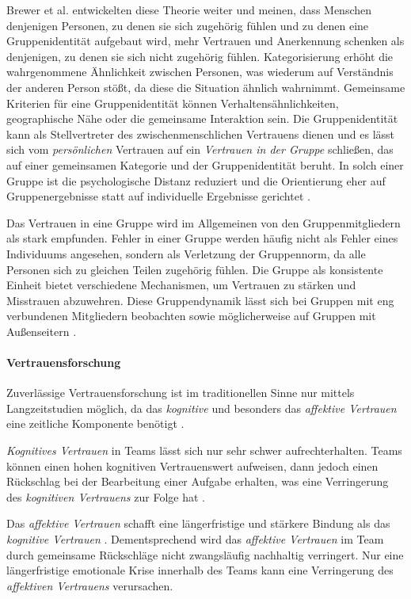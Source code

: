 \documentclass[a4paper,11pt]{article}%
\renewcommand{\\}{\vspace*{0.5\baselineskip} \newline}
\begin{document}
Brewer et al. \citep[S. 355-360]{brewer1981} entwickelten diese Theorie weiter und meinen, dass Menschen denjenigen Personen, zu denen sie sich zugehörig fühlen und zu denen eine Gruppenidentität aufgebaut wird, mehr Vertrauen und Anerkennung schenken als denjenigen, zu denen sie sich nicht zugehörig fühlen. Kategorisierung erhöht die wahrgenommene Ähnlichkeit zwischen Personen, was wiederum auf Verständnis der anderen Person stößt, da diese die Situation ähnlich wahrnimmt.
Gemeinsame Kriterien für eine Gruppenidentität können Verhaltensähnlichkeiten, geographische Nähe oder die gemeinsame Interaktion sein. Die Gruppenidentität kann als Stellvertreter des zwischenmenschlichen Vertrauens dienen und es lässt sich vom \textit{persönlichen} Vertrauen auf ein \textit{Vertrauen in der Gruppe} schließen, das auf einer gemeinsamen Kategorie und der Gruppenidentität beruht.
In solch einer Gruppe ist die psychologische Distanz reduziert und die Orientierung eher auf Gruppenergebnisse statt auf individuelle Ergebnisse gerichtet \citep[S. 355-360]{brewer1981}.

Das Vertrauen in eine Gruppe wird im Allgemeinen von den Gruppenmitgliedern als stark empfunden. Fehler in einer Gruppe werden häufig nicht als Fehler eines Individuums angesehen, sondern als Verletzung der Gruppennorm, da alle Personen sich zu gleichen Teilen zugehörig fühlen. Die Gruppe als konsistente Einheit bietet verschiedene Mechanismen, um Vertrauen zu stärken und Misstrauen abzuwehren. Diese Gruppendynamik lässt sich bei Gruppen mit eng verbundenen Mitgliedern beobachten sowie möglicherweise auf Gruppen mit Außenseitern \citep[S. 397-403]{stolle2002trusting}.

\paragraph{Vertrauensforschung}
\label{Vertrauensforschung}
Zuverlässige Vertrauensforschung ist im traditionellen Sinne nur mittels Langzeitstudien möglich, da das \textit{kognitive} und besonders das \textit{affektive Vertrauen} eine zeitliche Komponente benötigt \citep{jones1998experience}.

\textit{Kognitives Vertrauen} in Teams lässt sich nur sehr schwer aufrechterhalten. Teams können einen hohen kognitiven Vertrauenswert aufweisen, dann jedoch einen Rückschlag bei der Bearbeitung einer Aufgabe erhalten, was eine Verringerung des \textit{kognitiven Vertrauens} zur Folge hat \citep[S. 29-31]{mcallister1995affect}.

Das \textit{affektive Vertrauen} schafft eine längerfristige und stärkere Bindung als das \textit{kognitive Vertrauen} \citep[S. 29-31]{mcallister1995affect}.
Dementsprechend wird das \textit{affektive Vertrauen} im Team durch gemeinsame Rückschläge nicht zwangsläufig nachhaltig verringert. Nur eine längerfristige emotionale Krise innerhalb des Teams kann eine Verringerung des \textit{affektiven Vertrauens} verursachen. 
\end{document}

